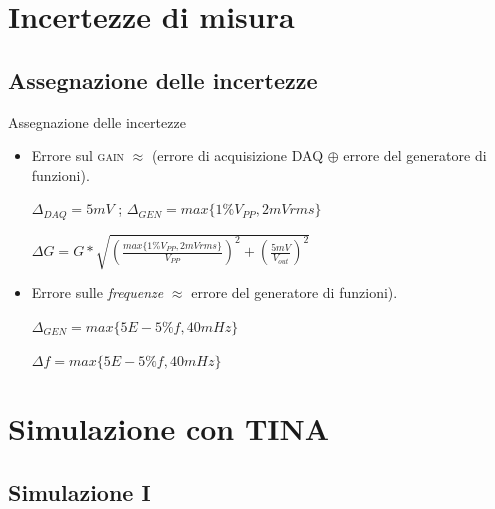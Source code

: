 \documentclass{beamer}
\begin{document}
\section{Incertezze di misura}

\subsection{Assegnazione delle incertezze}

\begin{frame}{Assegnazione delle incertezze}
\begin{itemize}
\item Errore sul \textsc{gain} $ \approx $ (errore di acquisizione DAQ $ \oplus $ errore del generatore di funzioni).

\begin{definition}
$ \Delta _{DAQ} = 5 mV$ ; $ \Delta _{GEN} = max\{1 \% V_{PP}, 2\si{mV}rms\}$
\end{definition}

\begin{example}
$\Delta G = G * \sqrt{(\frac{max\{1 \% V_{PP}, 2\si{mV}rms\}}{V_{PP}})^2 + (\frac{5\si{mV}}{V_{out}})^2}$
\end{example}


\item Errore sulle \textit{frequenze} $ \approx $ errore del generatore di funzioni).

\begin{definition}
$ \Delta _{GEN} = max\{5E-5 \% f, 40\si{mHz}\}$
\end{definition}

\begin{example}
$\Delta f = max\{5E-5 \% f, 40\si{mHz}\} $
\end{example}

\end{itemize}
\end{frame}

\section{Simulazione con TINA}


\subsection{Simulazione I}
\end{document}
